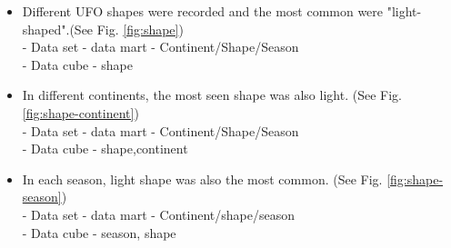 \documentclass[11pt, journal]{IEEEtran}
\begin{document}
\begin{itemize}
\begin{itemize}
            \item Different UFO shapes were recorded and the most common were "light-shaped".(See Fig. \ref{fig:shape})\\
            - Data set - data mart - Continent/Shape/Season\\
            - Data cube - shape
                
            \item In different continents, the most seen shape was also light. (See Fig. \ref{fig:shape-continent})\\
            - Data set - data mart - Continent/Shape/Season\\
            - Data cube - shape,continent
                
            \item In each season, light shape was also the most common. (See Fig. \ref{fig:shape-season})\\
            - Data set - data mart - Continent/shape/season\\
            - Data cube - season, shape
                

\end{itemize}
\end{itemize}
\end{document}
